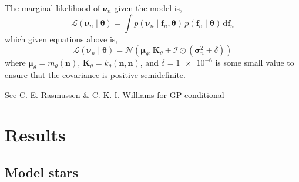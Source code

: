 \documentclass[linenumbers,modern]{aastex631dm}
\newcommand{\npred}{n_{\star}}
\newcommand{\dd}{\mathrm{d}}
\begin{document}
The marginal likelihood of \(\bm\nu_n\) given the model is,
%
\begin{equation}
    \mathcal{L}(\bm\nu_n \mid \bm\theta)
    = \int p(\bm\nu_n \mid \bm f_n, \bm\theta)
    \, p(\bm f_n \mid \bm\theta) \, \dd \bm f_n
\end{equation}
%
which given equations above is,
%
\begin{equation}
    \mathcal{L}(\bm\nu_n \mid \bm\theta) = \mathcal{N}\left( 
        \bm\mu_\theta, \bm K_\theta
        + \bm{\mathcal{I}} \odot (\bm\sigma_n^2 + \delta)
    \right)
\end{equation}
%
where \(\bm\mu_\theta = m_\theta(\bm n)\), \(\bm K_\theta = k_\theta(\bm n, \bm n)\), and
\(\delta = \num{1e-6}\) is some small value to ensure that the covariance is
positive semidefinite.

See C. E. Rasmussen \& C. K. I. Williams for GP conditional
%


\section{Results}\label{sec:results}




\subsection{Model stars}\label{sec:model-stars}
\end{document}
